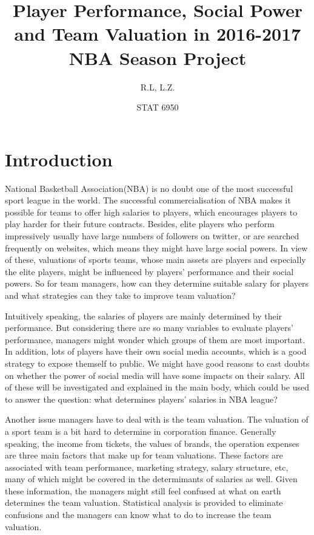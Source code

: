 \documentclass[12pt,]{article}
\title{\Large{\textbf{Player Performance, Social Power and Team Valuation in 2016-2017 NBA Season Project}}}
\author{R.L, L.Z.}
\date{STAT 6950}
\begin{document}
\maketitle

\section{Introduction}\label{intro}

National Basketball Association(NBA) is no doubt one of the most
successful sport league in the world. The successful commercialisation
of NBA makes it possible for teams to offer high salaries to players,
which encourages players to play harder for their future contracts.
Besides, elite players who perform impressively usually have large
numbers of followers on twitter, or are searched frequently on websites,
which means they might have large social powers. In view of these,
valuations of sports teams, whose main assets are players and especially
the elite players, might be influenced by players' performance and their
social powers. So for team managers, how can they determine suitable
salary for players and what strategies can they take to improve team
valuation?

Intuitively speaking, the salaries of players are mainly determined by
their performance. But considering there are so many variables to
evaluate players' performance, managers might wonder which groups of
them are most important. In addition, lots of players have their own
social media accounts, which is a good strategy to expose themself to
public. We might have good reasons to cast doubts on whether the power
of social media will have some impacts on their salary. All of these
will be investigated and explained in the main body, which could be used
to answer the question: what determines players' salaries in NBA league?

Another issue managers have to deal with is the team valuation. The
valuation of a sport team is a bit hard to determine in corporation
finance. Generally speaking, the income from tickets, the values of
brands, the operation expenses are three main factors that make up for
team valuations. These factors are associated with team performance,
marketing strategy, salary structure, etc, many of which might be
covered in the determimants of salaries as well. Given these
information, the managers might still feel confused at what on earth
determines the team valuation. Statistical analysis is provided to
eliminate confusions and the managers can know what to do to increase
the team valuation.
\end{document}
